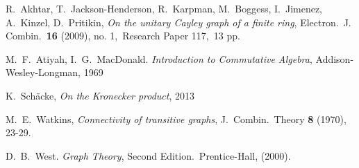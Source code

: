 \documentclass[a4paper,12pt]{article}
\begin{document}
\begin{thebibliography}{99}
	
	R.~Akhtar, T.~Jackson-Henderson, R.~Karpman, M.~Boggess, I.~Jimenez, A.~Kinzel, D.~Pritikin, \emph{On the unitary Cayley graph of a finite ring}, Electron.\ J. Combin.\ \textbf{16} (2009), no. 1,\ Research Paper 117,\ 13 pp.
	
	M.~F.~Atiyah, I.~G.~MacDonald. \emph{Introduction to Commutative Algebra}, Addison-Wesley-Longman, 1969
	
	
	K.~Schäcke, \emph{On the Kronecker product}, 2013
	
	M.~E.~Watkins, \emph{Connectivity of transitive graphs}, J.~Combin.\ Theory \textbf{8} (1970), 23-29.
	
	D.~B.~West. \emph{Graph Theory}, Second Edition.\ Prentice-Hall, (2000).
	
\end{thebibliography}
\end{document}
